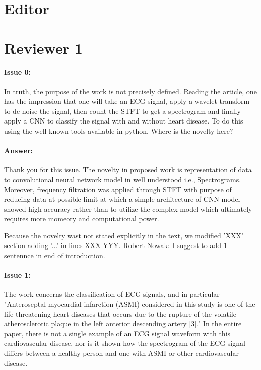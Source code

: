 \documentclass{article}
\begin{document}
\section{Editor}

\section{Reviewer 1}

\paragraph{Issue 0:}
\begin{displayquote}
In truth, the purpose of the work is not precisely defined. Reading the article, one has the impression that one will take an ECG signal, apply a wavelet transform to de-noise the signal, then count the STFT to get a spectrogram and finally apply a CNN to classify the signal with and without heart disease. To do this using the well-known tools available in python. Where is the novelty here?
\end{displayquote}

\paragraph{Answer:}
Thank you for this issue. The novelty in proposed work is representation of data to convolutional neural network model in well understood i.e., Spectrograms. Moreover,  frequency filtration was applied through STFT with purpose of reducing data at possible limit at which a simple architecture of CNN model showed high accuracy rather than to utilize the complex model which ultimately requires more momeory and computational power.

Because the novelty wast not stated explicitly in the text, we modified 'XXX' section adding '...' in lines XXX-YYY.
Robert Nowak: I suggest to add 1 sentennce in end of introduction.

\paragraph{Issue 1:}
\begin{displayquote}
The work concerns the classification of ECG signals, and in particular "Anteroseptal myocardial infarction (ASMI) considered in this study is one of the life-threatening heart diseases that occurs due to the rupture of the volatile atherosclerotic plaque in the left anterior descending artery [3]." In the entire paper, there is not a single example of an ECG signal waveform with this cardiovascular disease, nor is it shown how the spectrogram of the ECG signal differs between a healthy person and one with ASMI or other cardiovascular disease. 
\end{displayquote}
\end{document}
